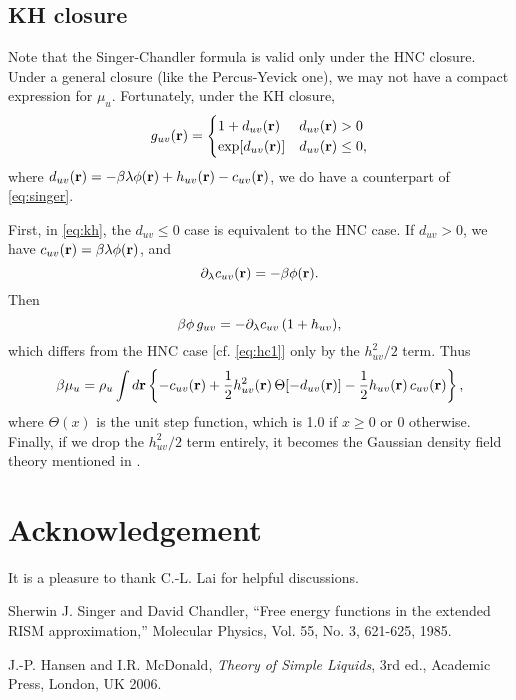 \documentclass[12pt]{article}
\begin{document}
\subsection{KH closure}

Note that the Singer-Chandler formula is valid
  only under the HNC closure.
Under a general closure (like the Percus-Yevick one),
  we may not have a compact expression for $\mu_u$.
Fortunately, under the KH closure,
\begin{equation}
  g_{uv}(\mathbf{r}) =
  \begin{cases}
    1 + d_{uv}(\mathbf{r})
    & d_{uv}(\mathbf{r}) > 0
  \\
    \exp[ d_{uv}(\mathbf{r}) ]
    & d_{uv}(\mathbf{r}) \le 0,
  \end{cases}
  \label{eq:kh}
\end{equation}
where $d_{uv}(\mathbf{r}) = -\beta \lambda \phi(\mathbf{r}) + h_{uv}(\mathbf{r}) - c_{uv}(\mathbf{r})$,
we do have a counterpart of \eqref{eq:singer}.


First, in \eqref{eq:kh}, the $d_{uv} \le 0$ case is equivalent to the HNC case.
%
If $d_{uv} > 0$, we have $c_{uv}(\mathbf{r}) = \beta \lambda \phi(\mathbf{r})$, and
\[
  \partial_\lambda c_{uv}(\mathbf{r}) = -\beta \phi(\mathbf{r}).
\]
Then
\[
  \beta \phi \, g_{uv}
  = -\partial_\lambda c_{uv} \, (1 + h_{uv}),
\]
which differs from the HNC case [cf. \eqref{eq:hc1}]
  only by the $h_{uv}^2/2$ term.
Thus
%
\begin{equation}
\beta \mu_u
  =
  \rho_u \int d\mathbf{r}
  \left\{
    - c_{uv}(\mathbf{r})
    + \frac{1}{2} h_{uv}^2(\mathbf{r}) \, \Theta[ -d_{uv}(\mathbf{r}) ]
    - \frac{1}{2} h_{uv}(\mathbf{r}) \, c_{uv}(\mathbf{r})
  \right\},
  \label{eq:singer-kh}
\end{equation}
%
where $\Theta(x)$ is the unit step function,
which is 1.0 if $x \ge 0$ or 0 otherwise.
%
Finally, if we drop the $h_{uv}^2/2$ term entirely,
it becomes the Gaussian density field theory mentioned in \cite{singer}.



\section*{Acknowledgement}
It is a pleasure to thank C.-L. Lai for helpful discussions.


\begin{thebibliography}{100}

  Sherwin J. Singer and David Chandler,
  ``Free energy functions in the extended RISM approximation,''
  Molecular Physics, Vol. 55, No. 3, 621-625,
  1985.

  J.-P. Hansen and I.R. McDonald,
  {\it Theory of Simple Liquids}, 3rd ed.,
  Academic Press, London, UK 2006.

\end{thebibliography}
\end{document}
